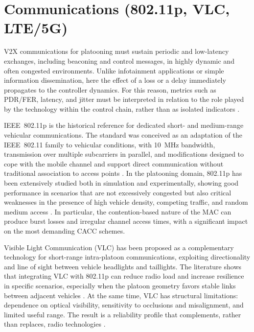 \section{Communications (802.11p, VLC, LTE/5G)}
\label{sec:sota_communications}

V2X communications for platooning must sustain periodic and low-latency exchanges, including beaconing and control messages, in highly dynamic and often congested environments. Unlike infotainment applications or simple information dissemination, here the effect of a loss or a delay immediately propagates to the controller dynamics. For this reason, metrics such as PDR/FER, latency, and jitter must be interpreted in relation to the role played by the technology within the control chain, rather than as isolated indicators \cite{segata2015communication,dressler2019cooperative,segata2023multi-technology}.

IEEE~802.11p is the historical reference for dedicated short- and medium-range vehicular communications. The standard was conceived as an adaptation of the IEEE~802.11 family to vehicular conditions, with 10~MHz bandwidth, transmission over multiple subcarriers in parallel, and modifications designed to cope with the mobile channel and support direct communication without traditional association to access points \cite{ieee80211p-2010,segata2016safe}. In the platooning domain, 802.11p has been extensively studied both in simulation and experimentally, showing good performance in scenarios that are not excessively congested but also critical weaknesses in the presence of high vehicle density, competing traffic, and random medium access \cite{segata2015communication}. In particular, the contention-based nature of the MAC can produce burst losses and irregular channel access times, with a significant impact on the most demanding CACC schemes.

Visible Light Communication (VLC) has been proposed as a complementary technology for short-range intra-platoon communications, exploiting directionality and line of sight between vehicle headlights and taillights. The literature shows that integrating VLC with 802.11p can reduce radio load and increase resilience in specific scenarios, especially when the platoon geometry favors stable links between adjacent vehicles \cite{ishihara2015improving,segata2016platooning,schettler2019deeply}. At the same time, VLC has structural limitations: dependence on optical visibility, sensitivity to occlusions and misalignment, and limited useful range. The result is a reliability profile that complements, rather than replaces, radio technologies \cite{hardes2019communication}.

